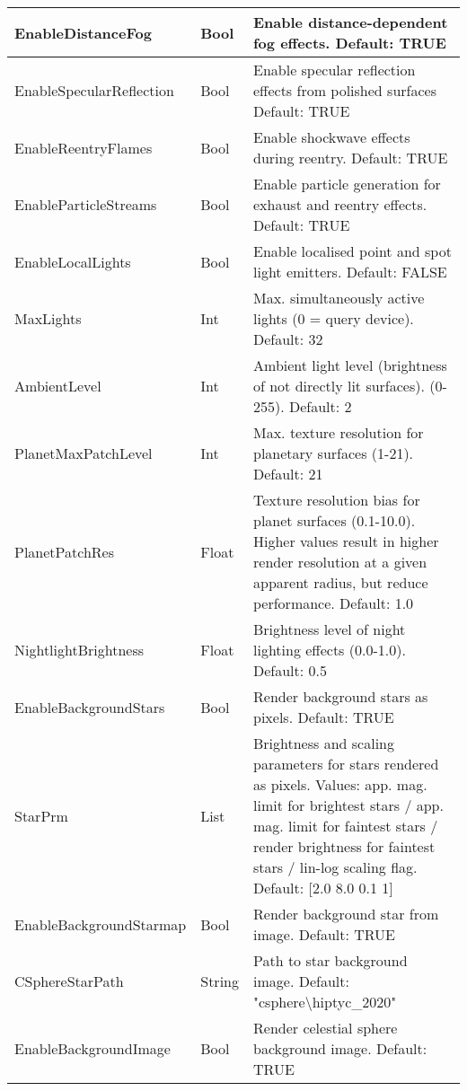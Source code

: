 \documentclass[Orbiter User Manual.tex]{subfiles}
\begin{document}
\begin{longtable}{ |p{}|p{}|p{}| }
	\hline\rule{0pt}{2ex}
	EnableDistanceFog & Bool & Enable distance-dependent fog effects. Default: TRUE\\
	\hline\rule{0pt}{2ex}
	EnableSpecular­Reflection & Bool & Enable specular reflection effects from polished surfaces Default: TRUE\\
	\hline\rule{0pt}{2ex}
	EnableReentryFlames & Bool & Enable shockwave effects during reentry. Default: TRUE\\
	\hline\rule{0pt}{2ex}
	EnableParticleStreams & Bool & Enable particle generation for exhaust and reentry effects. Default: TRUE\\
	\hline\rule{0pt}{2ex}
	EnableLocalLights & Bool & Enable localised point and spot light emitters. Default: FALSE\\
	\hline\rule{0pt}{2ex}
	MaxLights & Int & Max. simultaneously active lights (0 = query device). Default: 32\\
	\hline\rule{0pt}{2ex}
	AmbientLevel & Int & Ambient light level (brightness of not directly lit surfaces). (0-255). Default: 2\\
	\hline\rule{0pt}{2ex}
	PlanetMaxPatchLevel & Int & Max. texture resolution for planetary surfaces (1-21). Default: 21\\
	\hline\rule{0pt}{2ex}
	PlanetPatchRes & Float & Texture resolution bias for planet surfaces (0.1-10.0). Higher values result in higher render resolution at a given apparent radius, but reduce performance. Default: 1.0\\
	\hline\rule{0pt}{2ex}
	NightlightBrightness & Float & Brightness level of night lighting effects (0.0-1.0). Default: 0.5\\
	\hline\rule{0pt}{2ex}
	EnableBackgroundStars & Bool & Render background stars as pixels. Default: TRUE\\
	\hline\rule{0pt}{2ex}
	StarPrm & List & Brightness and scaling parameters for stars rendered as pixels. Values: app. mag. limit for brightest stars / app. mag. limit for faintest stars / render brightness for faintest stars / lin-log scaling flag. Default: [2.0 8.0 0.1 1]\\
	\hline\rule{0pt}{2ex}
	EnableBackgroundStarmap & Bool & Render background star from image. Default: TRUE\\
	\hline\rule{0pt}{2ex}
	CSphereStarPath & String & Path to star background image. Default: "csphere\textbackslash hiptyc\_2020"\\
	\hline\rule{0pt}{2ex}
	EnableBackgroundImage & Bool & Render celestial sphere background image. Default: TRUE\\

\end{longtable}
\end{document}
